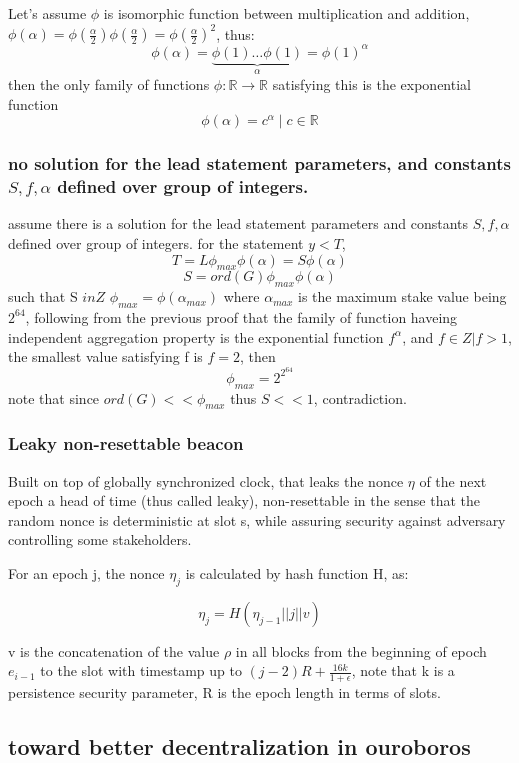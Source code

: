 \documentclass{article}
\begin{document}
Let's assume $\phi$ is isomorphic function
between multiplication and addition, $\phi(\alpha) =
\phi(\frac{\alpha}{2})\phi(\frac{\alpha}{2})=\phi(\frac{\alpha}{2})^2$,
thus:
$$\phi(\alpha)=\underbrace{\phi(1)\dots\phi(1)}_\text{$\alpha$}=\phi(1)^\alpha$$
then the only family of functions $\phi : \mathbb{R} \rightarrow
\mathbb{R}$ satisfying this is the exponential function
$$\phi(\alpha)=c^{\alpha} \mid c  \in \mathbb{R}$$

\subsubsection{ no solution for the lead statement parameters, and constants $S,f, \alpha$ defined over group of integers.}

assume there is a solution for the lead statement parameters and constants $S, f, \alpha$ defined over group of integers.
for the statement $y<T$, $$T=L\phi_{max}\phi(\alpha)=S\phi(\alpha)$$
$$S=ord(G)\phi_{max}\phi(\alpha)$$
such that S $in Z$
$\phi_{max}=\phi(\alpha_{max})$ where $\alpha_{max}$ is the maximum stake value being $2^{64}$, following from the previous proof that the family of function haveing independent aggregation property is the exponential function $f^\alpha$, and $f \in Z | f>1$, the smallest value satisfying f is $f=2$, then $$\phi_{max} = 2^{2^{64}}$$
note that since $ord(G)<<\phi_{max}$ thus $S<<1$, contradiction.


\subsubsection{ Leaky non-resettable beacon}

Built on top of globally synchronized clock, that leaks the nonce $\eta$
of the next epoch a head of time (thus called leaky), non-resettable
in the sense that the random nonce is deterministic at slot s, while
assuring security against adversary controlling some stakeholders.

For an epoch j, the nonce $\eta_j$ is calculated by hash function H, as:

$$\eta_j = H(\eta_{j-1}||j||v)$$

v is the concatenation of the value $\rho$ in all blocks from the
beginning of epoch $e_{i-1}$ to the slot with timestamp up to $(j-2)R +
\frac{16k}{1+\epsilon}$, note that k is a persistence security parameter,
R is the epoch length in terms of slots.

\subsection {toward better decentralization in ouroboros}
\end{document}
